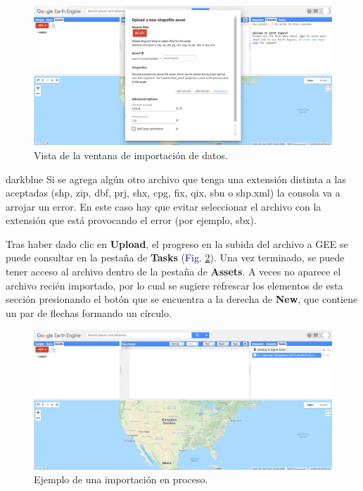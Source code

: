 \documentclass[
  12pt,
  letterpaper,
  twoside]{book}
\begin{document}
\begin{figure}[H]

{\centering \includegraphics[width=0.95\linewidth]{Img/Asset2} 

}

\caption{Vista de la ventana de importación de datos.}\label{fig:f43}
\end{figure}

\begin{bluebox2}

\begin{awesomeblock}{5pt}{\faLightbulb}{darkblue}
Si se agrega algún otro archivo que tenga una extensión distinta a las aceptadas (shp, zip, dbf, prj, shx, cpg, fix, qix, sbn o shp.xml) la consola va a arrojar un error. En este caso hay que evitar seleccionar el archivo con la extensión que está provocando el error (por ejemplo, sbx).

\end{awesomeblock}

\end{bluebox2}

Tras haber dado clic en \textbf{Upload}, el progreso en la subida del archivo a GEE se puede consultar en la pestaña de \textbf{Tasks} (\textcolor{darkblue}{Fig.} \ref{fig:f44}). Una vez terminado, se puede tener acceso al archivo dentro de la pestaña de \textbf{Assets}. A veces no aparece el archivo recién importado, por lo cual se sugiere refrescar los elementos de esta sección presionando el botón que se encuentra a la derecha de \textbf{New}, que contiene un par de flechas formando un círculo.

\begin{figure}[H]

{\centering \includegraphics[width=0.95\linewidth]{Img/Asset3} 

}

\caption{Ejemplo de una importación en proceso.}\label{fig:f44}
\end{figure}
\end{document}
